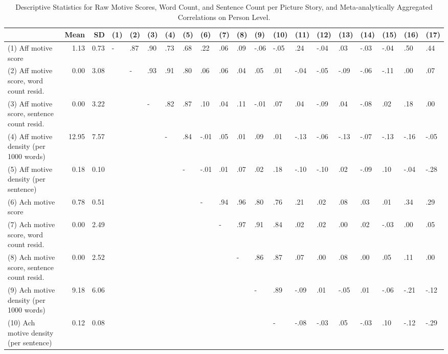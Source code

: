 \documentclass[man,a4paper,mask]{apa6}\usepackage[]{graphicx}\usepackage[]{color}
\begin{document}
\begin{table}
	\begin{threeparttable}
		\caption{Descriptive Statistics for Raw Motive Scores, Word Count, and Sentence Count per Picture Story, and Meta-analytically Aggregated Correlations on Person Level.}
		\label{tab:descCor}
		\footnotesize
		\begin{tabularx}{\textwidth}{Xrrlllllllllllllllll}
		\toprule
 & Mean & SD & (1) & (2) & (3) & (4) & (5) & (6) & (7) & (8) & (9) & (10) & (11) & (12) & (13) & (14) & (15) & (16) & (17) \\ 
  \hline
(1) Aff motive score & 1.13 & 0.73 & - & .87 & .90 & .73 & .68 & .22 & .06 & .09 & -.06 & -.05 & .24 & -.04 & .03 & -.03 & -.04 & .50 & .44 \\ 
  (2) Aff motive score, word count resid. & 0.00 & 3.08 &  & - & .93 & .91 & .80 & .06 & .06 & .04 & .05 & .01 & -.04 & -.05 & -.09 & -.06 & -.11 & .00 & .07 \\ 
  (3) Aff motive score, sentence count resid. & 0.00 & 3.22 &  &  & - & .82 & .87 & .10 & .04 & .11 & -.01 & .07 & .04 & -.09 & .04 & -.08 & .02 & .18 & .00 \\ 
  (4) Aff motive density (per 1000 words) & 12.95 & 7.57 &  &  &  & - & .84 & -.01 & .05 & .01 & .09 & .01 & -.13 & -.06 & -.13 & -.07 & -.13 & -.16 & -.05 \\ 
  (5) Aff motive density (per sentence) & 0.18 & 0.10 &  &  &  &  & - & -.01 & .01 & .07 & .02 & .18 & -.10 & -.10 & .02 & -.09 & .10 & -.04 & -.28 \\ 
  (6) Ach motive score & 0.78 & 0.51 &  &  &  &  &  & - & .94 & .96 & .80 & .76 & .21 & .02 & .08 & .03 & .01 & .34 & .29 \\ 
  (7) Ach motive score, word count resid. & 0.00 & 2.49 &  &  &  &  &  &  & - & .97 & .91 & .84 & .02 & .02 & .00 & .02 & -.03 & .00 & .05 \\ 
  (8) Ach motive score, sentence count resid. & 0.00 & 2.52 &  &  &  &  &  &  &  & - & .86 & .87 & .07 & .00 & .08 & .00 & .05 & .11 & .00 \\ 
  (9) Ach motive density (per 1000 words) & 9.18 & 6.06 &  &  &  &  &  &  &  &  & - & .89 & -.09 & .01 & -.05 & .01 & -.06 & -.21 & -.12 \\ 
  (10) Ach motive density (per sentence) & 0.12 & 0.08 &  &  &  &  &  &  &  &  &  & - & -.08 & -.03 & .05 & -.03 & .10 & -.12 & -.29 \\ 

\end{tabularx}
\end{threeparttable}
\end{table}
\end{document}

